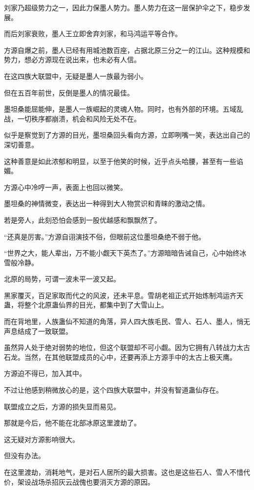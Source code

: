 \begin{this_body}
刘家乃超级势力之一，因此力保墨人势力。墨人势力在这一层保护伞之下，稳步发展。

而后刘家衰败，墨人王立即舍弃刘家，和马鸿运平等合作。

方源自爆之前，墨人已经有用城池数百座，占据北原三分之一的江山。这种规模和势力，想必方源现在说出来，也未必有人信。

在这四族大联盟中，无疑是墨人一族最为弱小。

但在五百年前世，反倒是墨人的情况最佳。

墨坦桑能屈能伸，是墨人一族崛起的灵魂人物。同时，也有外部的环境。五域乱战，一切秩序都崩溃，机会和风险无处不在。

似乎是察觉到了方源的目光，墨坦桑回头看向方源，立即咧嘴一笑，表达出自己的深切善意。

这种善意是如此浓郁和明显，以至于他笑的时候，近乎点头哈腰，甚至有一些谄媚。

方源心中冷哼一声，表面上也回以微笑。

墨坦桑的神情微变，表达出一种得到大人物赏识和青睐的激动之情。

若是旁人，此刻恐怕会感到一股优越感和飘飘然了。

“还真是厉害。”方源自诩演技不俗，但眼前这位墨坦桑绝不弱于他。

“世界之大，能人辈出，万不能小觑天下英杰了。”方源暗暗告诫自己，心中始终冰雪般冷静。

北原的局势，可谓一波未平一波又起。

黑家覆灭，百足家取而代之的风波，还未平息。雪胡老祖正式开始炼制鸿运齐天蛊，将整个北原蛊仙界的目光，都集中到了大雪山上。

而在背地里，人族蛊仙不知道的角落，异人四大族毛民、雪人、石人、墨人，悄无声息结成了一致联盟。

虽然异人处于绝对弱势的地位，但这个联盟却不可小觑。因为它拥有八转战力太古石龙。当然，在其他联盟成员的心中，还要再添上方源手中的太古上极天鹰。

方源迫不得已，加入其中。

不过让他感到稍微放心的是，这个四族大联盟中，并没有智道蛊仙存在。

联盟成立之后，方源的损失显而易见。

那就是今后，他不能在北部冰原这里渡劫了。

这无疑对方源影响很大。

但没有办法。

在这里渡劫，消耗地气，是对石人居所的最大损害。这也是这些石人、雪人不惜代价，架设战场杀招灰云战傀也要消灭方源的原因。


\end{this_body}
